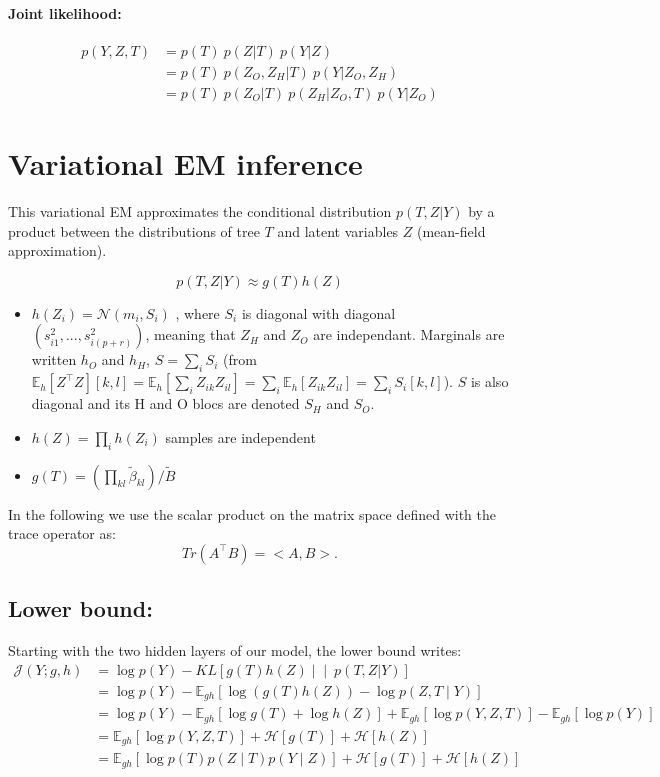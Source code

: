 \documentclass[11pt,a4paper]{article}
\newcommand{\Esp}{\mathds{E}}
\newcommand{\entr}{\mathcal{H}}
\begin{document}
\paragraph{Joint likelihood:}
\begin{align*}
p(Y,Z,T)& = p(T) \: p(Z|T) \: p(Y|Z) \\
&= p(T)\: p(Z_O,Z_H|T) \: p(Y|Z_O,Z_H) \\
&= p(T) \: p(Z_O|T) \: p(Z_H | Z_O,T)  \: p(Y|Z_O)
\end{align*} 
\section{Variational EM inference}

This variational EM approximates the conditional distribution $p(T,Z | Y)$ by a product  between the  distributions of tree $T$ and latent variables $Z$ (mean-field approximation).

$$p(T,Z | Y) \approx  g(T)h(Z)$$
\begin{itemize}
\item $ h(Z_i) =  \mathcal{N}(m_i,S_i)$ , where $S_i$ is diagonal with diagonal $(s_{i1}^2, ... , s_{i(p+r)}^2)$, meaning that $Z_H$ and $Z_O$ are independant. Marginals are written $h_O$  and  $h_H$, $S=\sum_i S_i$  (from $\Esp_h[Z^\intercal Z][k,l] = \Esp_h[\sum_i Z_{ik} Z_{il}] = \sum_i \Esp_h[Z_{ik}Z_{il}] = \sum_i S_i[k,l]$). $S$ is also diagonal and its H and O blocs are denoted $S_H$ and $S_O$.
\item $ h(Z) = \prod_i h(Z_i)$ samples are independent 
\item $ g(T) = \left(\prod_{kl} \widetilde{\beta}_{kl} \right) / \widetilde{B}$
\end{itemize}

In the following we use the scalar product on the matrix space defined with the trace operator as: 
$$  Tr(A^\intercal B) = <A,B> .$$
\subsection{Lower bound:}
Starting with the two hidden layers of our model, the lower bound writes:
\begin{align*}
\mathcal{J}(Y; g,h)&=\log p(Y) - KL\left[g(T) h(Z) \middle\vert\middle\vert\ p(T,Z | Y)\right]\\
&= \log p(Y) - \Esp_{gh}[\log( g(T) h(Z)) - \log p(Z,T\mid Y) ]\\
&= \log p(Y) - \Esp_{gh}[\log g(T) + \log h(Z) ] + \Esp_{gh}[\log p(Y,Z,T)] - \Esp_{gh}[\log p(Y)]\\
&= \Esp_{gh} [\log p(Y,Z,T)] + \entr[g(T)] + \entr[h(Z)]\\
&= \Esp_{gh} [\log p(T)p(Z\mid T)p(Y\mid Z)] + \entr[g(T)] + \entr[h(Z)]
\end{align*}
\end{document}
